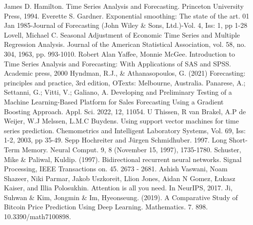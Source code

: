 \documentclass[diploma]{nanolab2015}
\begin{document}
\newpage
\begin{thebibliography}{00}
    James D. Hamilton. Time Series Analysis and Forecasting. Princeton University Press, 1994.
    Everette S. Gardner. Exponential smoothing: The state of the art. 01 Jan 1985-Journal of Forecasting (John Wiley \& Sons, Ltd.)-Vol. 4, Iss: 1, pp 1-28
    Lovell, Michael C. Seasonal Adjustment of Economic Time Series and Multiple Regression Analysis. Journal of the American Statistical Association, vol. 58, no. 304, 1963, pp. 993-1010.
    Robert Alan Yaffee, Monnie McGee. Introduction to Time Series Analysis and Forecasting: With Applications of SAS and SPSS. Academic press, 2000
    Hyndman, R.J., \& Athanasopoulos, G. (2021) Forecasting: principles and practice, 3rd edition, OTexts: Melbourne, Australia.
    Panarese, A.; Settanni, G.; Vitti, V.; Galiano, A. Developing and Preliminary Testing of a Machine Learning-Based Platform for Sales Forecasting Using a Gradient Boosting Approach. Appl. Sci. 2022, 12, 11054.
    U Thissen, R van Brakel, A.P de Weijer, W.J Melssen, L.M.C Buydens. Using support vector machines for time series prediction. Chemometrics and Intelligent Laboratory Systems, Vol. 69, Iss: 1-2, 2003, pp 35-49.
    Sepp Hochreiter and Jürgen Schmidhuber. 1997. Long Short-Term Memory. Neural Comput. 9, 8 (November 15, 1997), 1735-1780.
    Schuster, Mike \& Paliwal, Kuldip. (1997). Bidirectional recurrent neural networks. Signal Processing, IEEE Transactions on. 45. 2673 - 2681.
    Ashish Vaswani, Noam Shazeer, Niki Parmar, Jakob Uszkoreit, Llion Jones, Aidan N Gomez, Łukasz Kaiser, and Illia Polosukhin. Attention is all you need. In NeurIPS, 2017.
    Ji, Suhwan \& Kim, Jongmin \& Im, Hyeonseung. (2019). A Comparative Study of Bitcoin Price Prediction Using Deep Learning. Mathematics. 7. 898. 10.3390/math7100898.
\end{thebibliography}
\end{document}
